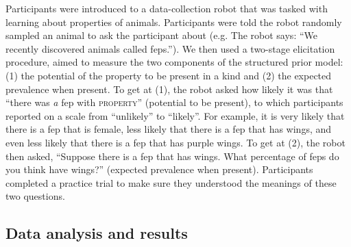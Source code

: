 \documentclass[12pt,letterpaper]{article}
\begin{document}
Participants were introduced to a data-collection robot that was tasked with learning about properties of animals. 
Participants were told the robot randomly sampled an animal to ask the participant about (e.g. The robot says: ``We recently discovered animals called feps.''). 
We then used a two-stage elicitation procedure, aimed to measure the two components of the structured prior model: (1) the potential of the property to be present in a kind and (2) the expected prevalence when present.
To get at (1), the robot asked how likely it was that ``there was \emph{a} fep with \textsc{property}'' (potential to be present), to which participants reported on a scale from ``unlikely'' to ``likely''.
For example, it is very likely that there is a fep that is female, less likely that there is a fep that has wings, and even less likely that there is a fep that has purple wings. 
To get at (2), the robot then asked, ``Suppose there is a fep that has wings. What percentage of feps do you think have wings?'' (expected prevalence when present). 
Participants completed a practice trial to make sure they understood the meanings of these two questions.

%

\subsection*{Data analysis and results}
\end{document}

